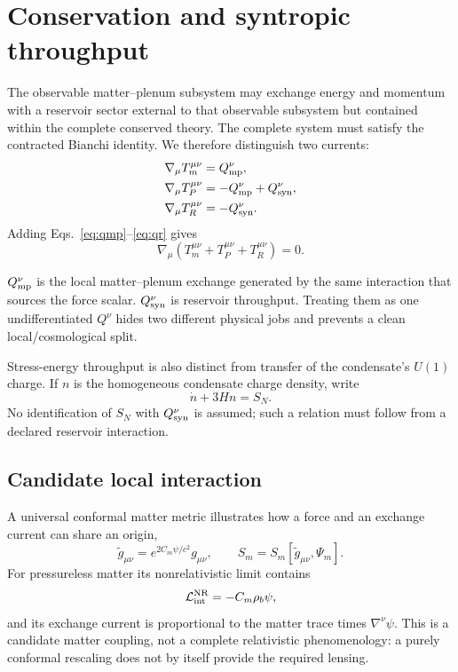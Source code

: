 \section{Conservation and syntropic throughput}

The observable matter--plenum subsystem may exchange energy and momentum with
a reservoir sector external to that observable subsystem but contained within
the complete conserved theory.  The complete system must satisfy the
contracted Bianchi identity.  We therefore distinguish two currents:
\begin{align}
 \nabla_\mu T_m^{\mu\nu} &= Q_{\rm mp}^{\nu},
 \label{eq:qmp}\\
 \nabla_\mu T_P^{\mu\nu} &= -Q_{\rm mp}^{\nu}+Q_{\rm syn}^{\nu},
 \label{eq:qp}\\
 \nabla_\mu T_R^{\mu\nu} &= -Q_{\rm syn}^{\nu}.
 \label{eq:qr}
\end{align}
Adding Eqs.~\eqref{eq:qmp}--\eqref{eq:qr} gives
\begin{equation}
 \nabla_\mu\left(T_m^{\mu\nu}+T_P^{\mu\nu}+T_R^{\mu\nu}\right)=0.
 \label{eq:total-conservation}
\end{equation}

$Q_{\rm mp}^{\nu}$ is the local matter--plenum exchange generated by the same
interaction that sources the force scalar.  $Q_{\rm syn}^{\nu}$ is reservoir
throughput.  Treating them as one undifferentiated $Q^\nu$ hides two different
physical jobs and prevents a clean local/cosmological split.

Stress-energy throughput is also distinct from transfer of the condensate's
$U(1)$ charge.  If $n$ is the homogeneous condensate charge density, write
\begin{equation}
 \dot n+3Hn=S_N.
 \label{eq:condensate-charge-source}
\end{equation}
No identification of $S_N$ with $Q_{\rm syn}^{\nu}$ is assumed; such a
relation must follow from a declared reservoir interaction.

\subsection{Candidate local interaction}

A universal conformal matter metric illustrates how a force and an exchange
current can share an origin,
\begin{equation}
 \widetilde g_{\mu\nu}=e^{2C_m\psi/c^2}g_{\mu\nu},
 \qquad
 S_m=S_m[\widetilde g_{\mu\nu},\Psi_m].
 \label{eq:conformal-candidate}
\end{equation}
For pressureless matter its nonrelativistic limit contains
\begin{equation}
 \mathcal L_{\rm int}^{\rm NR}=-C_m\rho_b\psi,
\end{equation}
and its exchange current is proportional to the matter trace times
$\nabla^\nu\psi$.  This is a candidate matter coupling, not a complete
relativistic phenomenology: a purely conformal rescaling does not by itself
provide the required lensing.

